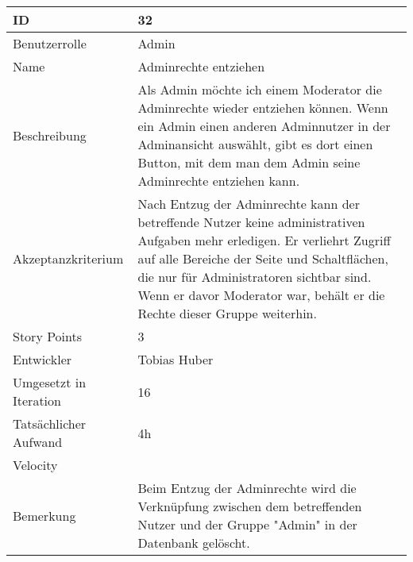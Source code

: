 \begin{tabularx}{\textwidth}{|p{}|X|}
	\hline
	ID & 32 \\
	\hline
	Benutzerrolle & Admin \\
	\hline
	Name & Adminrechte entziehen\\
	\hline
	Beschreibung & Als Admin möchte ich einem Moderator die Adminrechte wieder entziehen können. Wenn ein Admin einen anderen Adminnutzer in der Adminansicht auswählt, gibt es dort einen Button, mit dem man dem Admin seine Adminrechte entziehen kann.  \\
	\hline
	Akzeptanzkriterium & Nach Entzug der Adminrechte kann der betreffende Nutzer keine administrativen Aufgaben mehr erledigen. Er verliehrt Zugriff auf alle Bereiche der Seite und Schaltflächen, die nur für Administratoren sichtbar sind. Wenn er davor Moderator war, behält er die Rechte dieser Gruppe weiterhin. \\
	\hline
	Story Points & 3 \\
	\hline
	Entwickler & Tobias Huber \\
	\hline
	Umgesetzt in Iteration & 16\\
	\hline
	Tatsächlicher Aufwand & 4h\\
	\hline
	Velocity & \\
	\hline
	Bemerkung & Beim Entzug der Adminrechte wird die Verknüpfung zwischen dem betreffenden Nutzer und der Gruppe "Admin" in der Datenbank gelöscht.\\
	\hline
\end{tabularx}
\vspace{20pt}
